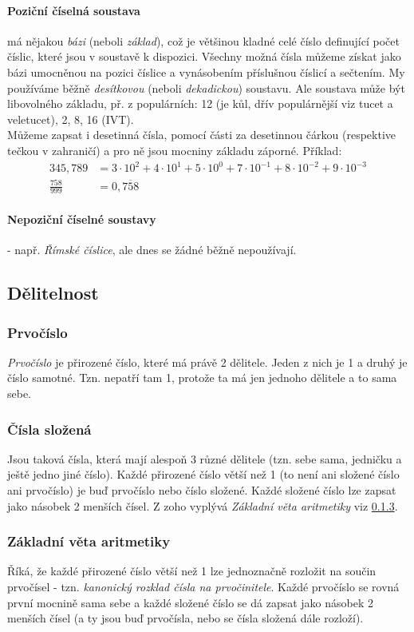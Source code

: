 \documentclass[12pt]{article}
\begin{document}
\paragraph{Poziční číselná soustava} má nějakou \emph{bázi} (neboli \emph{základ}), což je většinou kladné celé číslo definující počet číslic, které jsou v soustavě k dispozici. Všechny možná čísla můžeme získat jako bázi umocněnou na pozici číslice a vynásobením příslušnou číslicí a sečtením. My používáme běžně \emph{desítkovou} (neboli \emph{dekadickou}) soustavu. Ale soustava může být libovolného základu, př. z populárních: 12 (je kůl, dřív populárnější viz tucet a veletucet), 2, 8, 16 (IVT).\\
Můžeme zapsat i desetinná čísla, pomocí části za desetinnou čárkou (respektive tečkou v zahraničí) a pro ně jsou mocniny základu záporné. Příklad:
\begin{align}
345,789 &= 3 \cdot 10^{2} + 4 \cdot 10^{1} + 5 \cdot 10^{0} + 7 \cdot 10^{-1} + 8 \cdot 10^{-2} + 9 \cdot 10^{-3}\\
\frac{758}{999} &= 0,\overline{758}
\end{align}
\paragraph{Nepoziční číselné soustavy} - např. \emph{Římské číslice}, ale dnes se žádné běžně nepoužívají.
\subsection{Dělitelnost}
\subsubsection{Prvočíslo}
\emph{Prvočíslo} je přirozené číslo, které má právě 2 dělitele. Jeden z nich je 1 a druhý je číslo samotné. Tzn. nepatří tam 1, protože ta má jen jednoho dělitele a to sama sebe.
\subsubsection{Čísla složená}
Jsou taková čísla, která mají alespoň 3 různé dělitele (tzn. sebe sama, jedničku a ještě jedno jiné číslo). Každé přirozené číslo větší než 1 (to není ani složené číslo ani prvočíslo) je buď prvočíslo nebo číslo složené. Každé  složené číslo lze zapsat jako násobek 2 menších čísel. Z zoho vyplývá \emph{Základní věta aritmetiky} viz \ref{sec:zakladni_veta_aritmetiky}.
\subsubsection{Základní věta aritmetiky}
\label{sec:zakladni_veta_aritmetiky}
Říká, že každé přirozené číslo větší než 1 lze jednoznačně rozložit na součin prvočísel - tzn. \emph{kanonický rozklad čísla na prvočinitele}. Každé prvočíslo se rovná první mocnině sama sebe a každé složené číslo se dá zapsat jako násobek 2 menších čísel (a ty jsou buď prvočísla, nebo se čísla složená dále rozloží).
\end{document}
